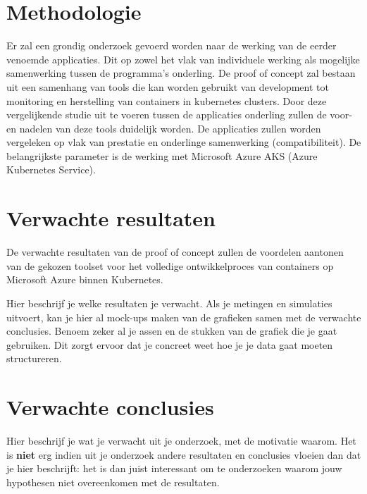 \section{Methodologie}
\label{sec:methodologie}

Er zal een grondig onderzoek gevoerd worden naar de werking van de eerder venoemde applicaties. Dit op zowel het vlak van individuele werking als mogelijke samenwerking tussen de programma's onderling. De proof of concept zal bestaan uit een samenhang van tools die kan worden gebruikt van development tot monitoring en herstelling van containers in kubernetes clusters. Door deze vergelijkende studie uit te voeren tussen de applicaties onderling zullen de voor- en nadelen van deze tools duidelijk worden. De applicaties zullen worden vergeleken op vlak van prestatie en onderlinge samenwerking (compatibiliteit). De belangrijkste parameter is de werking met Microsoft Azure AKS (Azure Kubernetes Service).


\section{Verwachte resultaten}
\label{sec:verwachte_resultaten}

De verwachte resultaten van de proof of concept zullen de voordelen aantonen van de gekozen toolset voor het volledige ontwikkelproces van containers op Microsoft Azure binnen Kubernetes. 

Hier beschrijf je welke resultaten je verwacht. Als je metingen en simulaties uitvoert, kan je hier al mock-ups maken van de grafieken samen met de verwachte conclusies. Benoem zeker al je assen en de stukken van de grafiek die je gaat gebruiken. Dit zorgt ervoor dat je concreet weet hoe je je data gaat moeten structureren.

\section{Verwachte conclusies}
\label{sec:verwachte_conclusies}

Hier beschrijf je wat je verwacht uit je onderzoek, met de motivatie waarom. Het is \textbf{niet} erg indien uit je onderzoek andere resultaten en conclusies vloeien dan dat je hier beschrijft: het is dan juist interessant om te onderzoeken waarom jouw hypothesen niet overeenkomen met de resultaten.

